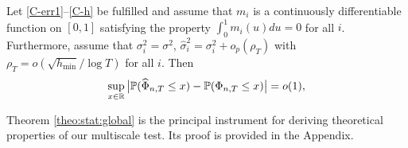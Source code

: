 \documentclass[a4paper,12pt]{article}
\makeatletter
\renewcommand{\eqref}[1]{\tagform@{\ref{#1}}}
\newcommand{\doublehattwo}[1]{\widehat{\widehat{#1}}}
\makeatother
\begin{document}
\begin{theorem}\label{theo:stat:global}
Let \ref{C-err1}--\ref{C-h} be fulfilled and assume that $m_i$ is a continuously differentiable function on $[0, 1]$ satisfying the property $\int_0^1 m_i(u) du = 0$ for all $i$. Furthermore, assume that $\sigma_i^2 = \sigma^2$, $\widehat{\sigma}_i^2 = \sigma^2_i + o_p(\rho_T)$ with $\rho_T = o(\sqrt{h_{\min}}/\log T)$ for all $i$. Then  
\begin{equation*}
\sup_{x \in \mathbb{R}} \big| \mathbb{P}(\widehat{\Phi}_{n, T} \le x) - \mathbb{P}(\Phi_{n,T} \le x) \big| = o(1),
\end{equation*}
\end{theorem}
Theorem \ref{theo:stat:global} is the principal instrument for deriving theoretical properties of our multiscale test. Its proof is provided in the Appendix. 




 
\end{document}
